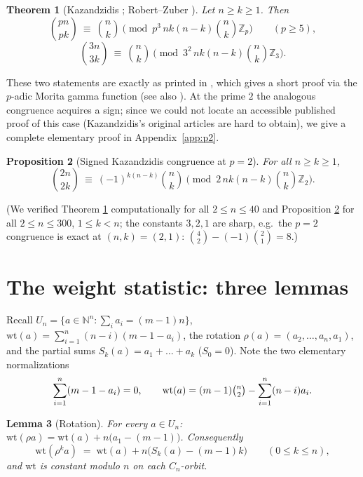 \documentclass[11pt]{amsart}
\newtheorem{theorem}{Theorem}[section]
\newtheorem{lemma}[theorem]{Lemma}
\newtheorem{proposition}[theorem]{Proposition}
\theoremstyle{definition}
\newcommand{\ZZ}{\mathbb{Z}}
\newcommand{\NN}{\mathbb{N}}
\newcommand{\wt}{\mathrm{wt}}
\begin{document}
\begin{theorem}[Kazandzidis \cite{Kaz}; Robert--Zuber \cite{RobertZuber}]\label{thm:kaz}
Let $n\ge k\ge 1$. Then
\[
\binom{pn}{pk}\ \equiv\ \binom nk \pmod{p^3\,nk(n-k)\binom nk\ZZ_p}\qquad(p\ge5),
\]
\[
\binom{3n}{3k}\ \equiv\ \binom nk \pmod{3^2\,nk(n-k)\binom nk\ZZ_3}.
\]
\end{theorem}

These two statements are exactly as printed in \cite{RobertZuber}, which gives a short proof via the $p$-adic Morita gamma function (see also \cite[VII.1.6]{RobertBook}). At the prime $2$ the analogous congruence acquires a sign; since we could not locate an accessible published proof of this case (Kazandzidis's original articles \cite{Kaz} are hard to obtain), we give a complete elementary proof in Appendix~\ref{app:p2}.

\begin{proposition}[Signed Kazandzidis congruence at $p=2$]\label{prop:kaz2}
For all $n\ge k\ge 1$,
\[
\binom{2n}{2k}\ \equiv\ (-1)^{k(n-k)}\binom nk \pmod{2\,nk(n-k)\binom nk\ZZ_2}.
\]
\end{proposition}

(We verified Theorem \ref{thm:kaz} computationally for all $2\le n\le 40$ and Proposition \ref{prop:kaz2} for all $2\le n\le 300$, $1\le k<n$; the constants $3,2,1$ are sharp, e.g.\ the $p=2$ congruence is exact at $(n,k)=(2,1)$: $\binom42-(-1)\binom21=8$.)

\section{The weight statistic: three lemmas}\label{sec:lemmas}

Recall $U_n=\{a\in\NN^n:\sum_i a_i=(m-1)n\}$, $\wt(a)=\sum_{i=1}^n(n-i)(m-1-a_i)$, the rotation $\rho(a)=(a_2,\dots,a_n,a_1)$, and the partial sums $S_k(a)=a_1+\dots+a_k$ ($S_0=0$). Note the two elementary normalizations
\begin{equation}\label{eq:wtnorm}
\sum_{i=1}^n (m-1-a_i)=0,
\qquad
\wt(a)= (m-1)\tbinom n2-\sum_{i=1}^n(n-i)a_i .
\end{equation}

\begin{lemma}[Rotation]\label{lem:rot}
For every $a\in U_n$: $\wt(\rho a)=\wt(a)+n\big(a_1-(m-1)\big)$. Consequently
\[
\wt(\rho^k a)\;=\;\wt(a)+n\big(S_k(a)-(m-1)k\big)\qquad(0\le k\le n),
\]
and $\wt$ is constant modulo $n$ on each $C_n$-orbit.
\end{lemma}
\end{document}
